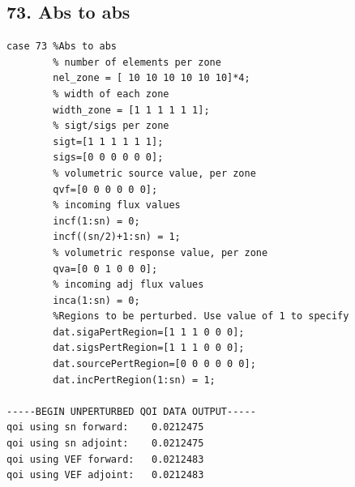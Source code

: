 \documentclass{article}
\begin{document}
\subsection{73. Abs to abs}
\begin{verbatim}
case 73 %Abs to abs
        % number of elements per zone
        nel_zone = [ 10 10 10 10 10 10]*4;
        % width of each zone
        width_zone = [1 1 1 1 1 1];
        % sigt/sigs per zone
        sigt=[1 1 1 1 1 1];
        sigs=[0 0 0 0 0 0];
        % volumetric source value, per zone
        qvf=[0 0 0 0 0 0];
        % incoming flux values
        incf(1:sn) = 0;
        incf((sn/2)+1:sn) = 1;
        % volumetric response value, per zone
        qva=[0 0 1 0 0 0];
        % incoming adj flux values
        inca(1:sn) = 0;
        %Regions to be perturbed. Use value of 1 to specify
        dat.sigaPertRegion=[1 1 1 0 0 0];
        dat.sigsPertRegion=[1 1 1 0 0 0];
        dat.sourcePertRegion=[0 0 0 0 0 0];
        dat.incPertRegion(1:sn) = 1; 
        
-----BEGIN UNPERTURBED QOI DATA OUTPUT----- 
qoi using sn forward: 	 0.0212475 
qoi using sn adjoint: 	 0.0212475 
qoi using VEF forward: 	 0.0212483 
qoi using VEF adjoint: 	 0.0212483 
\end{verbatim}
\end{document}
